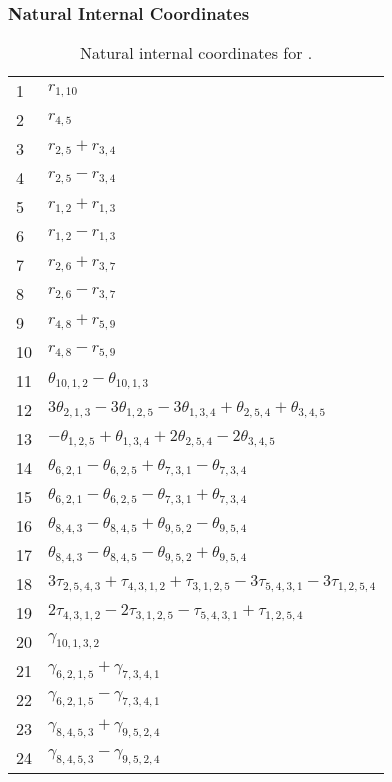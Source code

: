 \documentclass[10pt,oneside]{article}
\begin{document}
\begin{table}[h!]
\subsubsection*{Natural Internal Coordinates}
\centering
\caption{Natural internal coordinates for .}
\small
\begin{tabular}{ll}
\toprule
  1   & $r_{1,10}$ \\
  2   & $r_{4,5}$ \\
  3   & $r_{2,5} + r_{3,4}$ \\
  4   & $r_{2,5} - r_{3,4}$ \\
  5   & $r_{1,2} + r_{1,3}$ \\
  6   & $r_{1,2} - r_{1,3}$ \\
  7   & $r_{2,6} + r_{3,7}$ \\
  8   & $r_{2,6} - r_{3,7}$ \\
  9   & $r_{4,8} + r_{5,9}$ \\
  10  & $r_{4,8} - r_{5,9}$ \\
  11  & $\theta_{10,1,2} - \theta_{10,1,3}$ \\
  12  & $3\theta_{2,1,3} - 3\theta_{1,2,5} - 3\theta_{1,3,4} + \theta_{2,5,4} + \theta_{3,4,5}$ \\
  13  & $-\theta_{1,2,5} + \theta_{1,3,4} + 2\theta_{2,5,4} - 2\theta_{3,4,5}$ \\
  14  & $\theta_{6,2,1} - \theta_{6,2,5} + \theta_{7,3,1} - \theta_{7,3,4}$ \\
  15  & $\theta_{6,2,1} - \theta_{6,2,5} - \theta_{7,3,1} + \theta_{7,3,4}$ \\
  16  & $\theta_{8,4,3} - \theta_{8,4,5} + \theta_{9,5,2} - \theta_{9,5,4}$ \\
  17  & $\theta_{8,4,3} - \theta_{8,4,5} - \theta_{9,5,2} + \theta_{9,5,4}$ \\
  18  & $3\tau_{2,5,4,3} + \tau_{4,3,1,2} + \tau_{3,1,2,5} - 3\tau_{5,4,3,1} - 3\tau_{1,2,5,4}$ \\
  19  & $2\tau_{4,3,1,2} - 2\tau_{3,1,2,5} - \tau_{5,4,3,1} + \tau_{1,2,5,4}$ \\
  20  & $\gamma_{10,1,3,2}$ \\
  21  & $\gamma_{6,2,1,5} + \gamma_{7,3,4,1}$ \\
  22  & $\gamma_{6,2,1,5} - \gamma_{7,3,4,1}$ \\
  23  & $\gamma_{8,4,5,3} + \gamma_{9,5,2,4}$ \\
  24  & $\gamma_{8,4,5,3} - \gamma_{9,5,2,4}$ \\
\bottomrule
\end{tabular}
\end{table}
\end{document}
